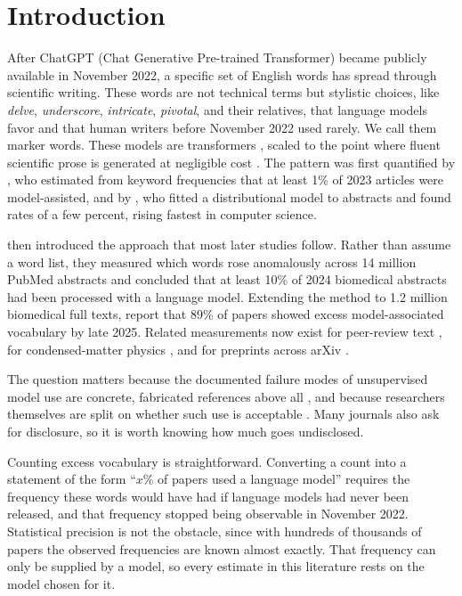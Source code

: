 \documentclass[twocolumn]{aastex631}
\newcommand{\pixelA}{\usebox{\pixelAbox}}
\begin{document}
\section{Introduction}\label{sec:intro}
After ChatGPT (Chat Generative Pre-trained Transformer) became publicly available in November 2022, a specific set of English words has spread through scientific writing. These words are not technical terms but stylistic choices, like \textit{delve}, \textit{underscore}, \textit{intricate}, \textit{pivotal}, and their relatives, that language models favor and that human writers before November 2022 used rarely. We call them marker words. These models are transformers \citep{Vaswani2017}, scaled to the point where fluent scientific prose is generated at negligible cost \citep{Brown2020}. The pattern was first quantified by \citet{Gray2025}, who estimated from keyword frequencies that at least 1\% of 2023 articles were model-assisted, and by \citet{Liang2024}, who fitted a distributional model to abstracts and found rates of a few percent, rising fastest in computer science.

\citet{Kobak2024} then introduced the approach that most later studies follow. Rather than assume a word list, they measured which words rose anomalously across 14 million PubMed abstracts and concluded that at least 10\% of 2024 biomedical abstracts had been processed with a language model. Extending the method to 1.2 million biomedical full texts, \citet{Holzwarth2026} report that 89\% of papers showed excess model-associated vocabulary by late 2025. Related measurements now exist for peer-review text \citep{Liang2024review}, for condensed-matter physics \citep{Xu2024}, and for preprints across arXiv \citep{Juzek2025, Bao2025}.

The question matters because the documented failure modes of unsupervised model use are concrete, fabricated references above all \citep{Walters2023, Topaz2026}, and because researchers themselves are split on whether such use is acceptable \citep{Kwon2025}. Many journals also ask for disclosure, so it is worth knowing how much goes undisclosed.

Counting excess vocabulary is straightforward. Converting a count into a statement of the form ``$x$\% of papers used a language model'' requires the frequency these words would have had if language models had never been released, and that frequency stopped being observable in November 2022. Statistical precision is not the obstacle, since with hundreds of thousands of papers the observed frequencies are known almost exactly. That frequency can only be supplied by a model, so every estimate in this literature rests on the model chosen for it.
\end{document}
